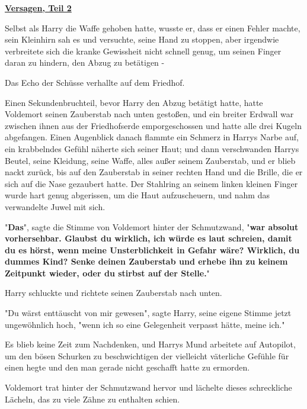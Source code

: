 

\hypertarget{versagen-teil-2}{%

\textbf{\uline{Versagen, Teil 2}}

Selbst als Harry die Waffe gehoben hatte, wusste er, dass er einen Fehler machte, sein Kleinhirn sah es und versuchte, seine Hand zu stoppen, aber irgendwie verbreitete sich die kranke Gewissheit nicht schnell genug, um seinen Finger daran zu hindern, den Abzug zu betätigen -

Das Echo der Schüsse verhallte auf dem Friedhof.

Einen Sekundenbruchteil, bevor Harry den Abzug betätigt hatte, hatte Voldemort seinen Zauberstab nach unten gestoßen, und ein breiter Erdwall war zwischen ihnen aus der Friedhofserde emporgeschossen und hatte alle drei Kugeln abgefangen. Einen Augenblick danach flammte ein Schmerz in Harrys Narbe auf, ein krabbelndes Gefühl näherte sich seiner Haut; und dann verschwanden Harrys Beutel, seine Kleidung, seine Waffe, alles außer seinem Zauberstab, und er blieb nackt zurück, bis auf den Zauberstab in seiner rechten Hand und die Brille, die er sich auf die Nase gezaubert hatte. Der Stahlring an seinem linken kleinen Finger wurde hart genug abgerissen, um die Haut aufzuscheuern, und nahm das verwandelte Juwel mit sich.

"\textbf{Das}", sagte die Stimme von Voldemort hinter der Schmutzwand, "\textbf{war absolut vorhersehbar. Glaubst du wirklich, ich würde es laut schreien, damit du es hörst, wenn meine Unsterblichkeit in Gefahr wäre? Wirklich, du dummes Kind? Senke deinen Zauberstab und erhebe ihn zu keinem Zeitpunkt wieder, oder du stirbst auf der Stelle.}"

Harry schluckte und richtete seinen Zauberstab nach unten.

"Du wärst enttäuscht von mir gewesen", sagte Harry, seine eigene Stimme jetzt ungewöhnlich hoch, "wenn ich so eine Gelegenheit verpasst hätte, meine ich."

Es blieb keine Zeit zum Nachdenken, und Harrys Mund arbeitete auf Autopilot, um den bösen Schurken zu beschwichtigen der vielleicht väterliche Gefühle für einen hegte und den man gerade nicht geschafft hatte zu ermorden.

Voldemort trat hinter der Schmutzwand hervor und lächelte dieses schreckliche Lächeln, das zu viele Zähne zu enthalten schien.

}
